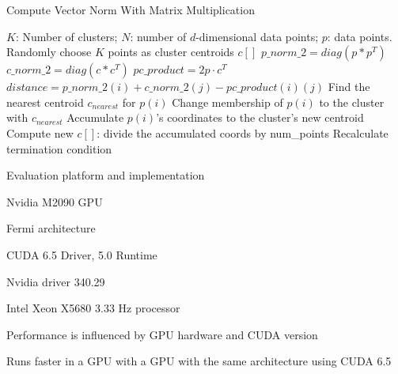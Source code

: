 \documentclass[
nopagebreaks,
style=klope,
fleqn]{powerdot}
\begin{document}
\begin{slide}{Compute Vector Norm With Matrix Multiplication}
  \footnotesize
  \begin{algorithmic}[1]
    \INPUT $K$: Number of clusters; $N$: number of $d$-dimensional data points; $p$: data points.
     \label{alg:pm2}
    \State Randomly choose $K$ points as cluster centroids $c[]$
    \State $p\_norm\_2 = diag(p * p^T)$
    \State $c\_norm\_2 = diag(c * c^T)$
    \State $pc\_product = 2 p \cdot c^T$
    \State $distance = p\_norm\_2(i) + c\_norm\_2(j) - pc\_product(i)(j)$
    \EndFor
    \State Find the nearest centroid $c_{nearest}$ for $p(i)$
    \State Change membership of $p(i)$ to the cluster with $c_{nearest}$
    \State Accumulate $p(i)$'s coordinates to the cluster's new centroid
    \EndParFor
    \State Compute new $c[]$: divide the accumulated coords by num\_points
    \State Recalculate termination condition
    \EndWhile
    \EndFunction
  \end{algorithmic}
\end{slide}

\begin{slide}{Evaluation platform and implementation}
  \begin{compactitem}
  \item{Nvidia M2090 GPU
    \begin{compactitem}
    \item{Fermi architecture}
    \item{CUDA 6.5 Driver, 5.0 Runtime}
    \item{Nvidia driver 340.29}
    \end{compactitem}
  }
  \item{Intel Xeon X5680 3.33 Hz processor}
  \item{Performance is influenced by GPU hardware and CUDA version
    \begin{compactitem}
    \item{Runs faster in a GPU with a GPU with the same architecture using CUDA 6.5}  
    \end{compactitem}
  }
  \end{compactitem}
\end{slide}
\end{document}
